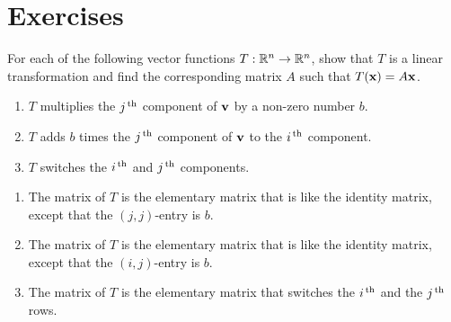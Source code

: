 \section*{Exercises}

\begin{ex}
  For each of the following vector functions $T:\mathbb{R}^{n}\to\mathbb{R}^{n}$, show
  that $T$ is a linear transformation and find the corresponding
  matrix $A$ such that $T(\mbox{\bf x}) = A\mbox{\bf x}$.
  \begin{enumerate}
  \item $T$ multiplies the $j^{\,\rm th}$ component of $\mbox{\bf v}$ by a
    non-zero number $b$.
  \item $T$ adds $b$ times the
    $j^{\,\rm th}$ component of $\mbox{\bf v}$ to the $i^{\,\rm th}$ component.
  \item $T$ switches the $i^{\,\rm th}$ and $j^{\,\rm th}$ components.
  \end{enumerate}
  \begin{sol}
    \begin{enumerate}
    \item The matrix of $T$ is the elementary matrix that is like the
      identity matrix, except that the $(j,j)$-entry is $b$.
    \item The matrix of $T$ is the elementary matrix that is like the
      identity matrix, except that the $(i,j)$-entry is $b$.
    \item The matrix of $T$ is the elementary matrix that switches the
      $i^{\,\rm th}$ and the $j^{\,\rm th}$ rows.
    \end{enumerate}
  \end{sol}
\end{ex}

